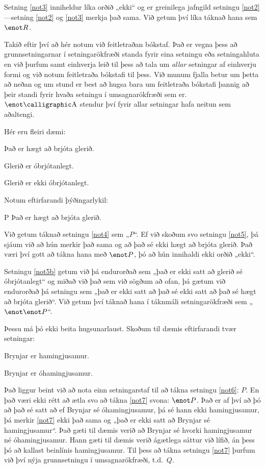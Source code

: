 Setning \ref{not3} inniheldur líka orðið „ekki“ og er greinilega jafngild setningu \ref{not2}---setning \ref{not2} og \ref{not3} merkja það sama. Við getum því líka táknað hana sem $\enot R$.

 Takið eftir því að hér notum við feitletraðan bókstaf. Það er vegna þess að grunnsetningarnar í setningarökfræði standa fyrir eina setningu eða setningahluta en við þurfum samt einhverja leið til þess að tala um \emph{allar} setningar af einhverju formi og við notum feitletraða bókstafi til þess. Við munum fjalla betur um þetta að neðan og um stund er best að hugsa bara um feitletraða bókstafi þannig að þeir standi fyrir hvaða setningu í umsagnarökfræði sem er. $\enot\meta{A}$ stendur því fyrir allar setningar hafa neitun sem aðaltengi.

Hér eru fleiri dæmi:
	\begin{earg}
		\item[\ex{not4}] Það er hægt að brjóta glerið.
		\item[\ex{not5}] Glerið er óbrjótanlegt.
		\item[\ex{not5b}] Glerið er ekki óbrjótanlegt.
	\end{earg}
Notum eftirfarandi þýðingarlykil:
	\begin{ekey}
		\item[P] Það er hægt að brjóta glerið.
	\end{ekey}
Við getum táknað setningu \ref{not4} sem „\emph{P}“. Ef við skoðum svo setningu \ref{not5}, þá sjáum við að hún merkir það sama og að það sé ekki hægt að brjóta glerið. Það væri því gott að tákna hana með $\enot P$, þó að hún innihaldi ekki orðið „ekki“. 

Setningu \ref{not5b} getum við þá endurorðað sem „það er ekki satt að glerið sé óbrjótanlegt“ og miðað við það sem við sögðum að ofan, þá gætum við endurorðað þá setningu sem „það er ekki satt að það sé ekki satt að það sé hægt að brjóta glerið“. Við getum því táknað hana í táknmáli setningarökfræði sem „$\enot \enot P$“. 

Þessu má þó ekki beita hugsunarlaust. Skoðum til dæmis eftirfarandi tvær setningar:
	\begin{earg}
		\item[\ex{not6}] Brynjar er hamingjusamur.
		\item[\ex{not7}] Brynjar er óhamingjusamur.
	\end{earg}
Það liggur beint við að nota einn setningarstaf til að tákna setningu \ref{not6}: $P$. En það væri ekki rétt að ætla svo að tákna \ref{not7} svona: $\enot P$. Það er af því að þó að það sé satt að ef Brynjar sé óhamingjusamur, þá sé hann ekki hamingjusamur, þá merkir \ref{not7} ekki það sama og „það er ekki satt að Brynjar sé hamingjusamur“. Það gæti til dæmis verið að Brynjar sé hvorki hamingjusamur né óhamingjusamur. Hann gæti til dæmis verið ágætlega sáttur við lífið, án þess þó að kallast beinlínis hamingjusamur. Til þess að tákna setningu \ref{not7} þurfum við því nýja grunnsetningu í umsagnarökfræði, t.d.\ $Q$.

